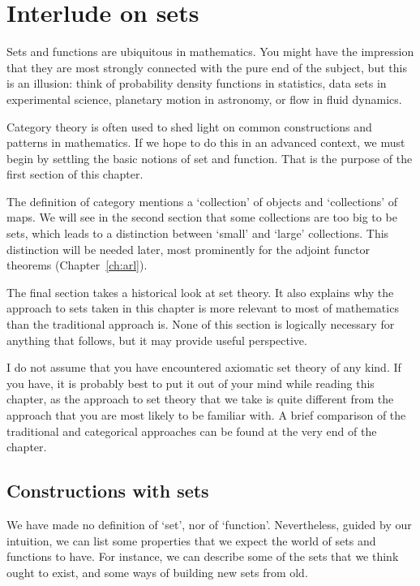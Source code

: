 % 
% 
% 

\chapter{Interlude on sets}
\label{ch:sets}

Sets and functions are ubiquitous in mathematics.  You might have the
impression that they are most strongly connected with the pure end of the
subject, but this is an illusion: think of probability density functions in
statistics, data sets in experimental science, planetary motion in
astronomy, or flow in fluid dynamics.

Category theory is often used to shed light on common constructions and
patterns in mathematics.  If we hope to do this in an advanced context, we
must begin by settling the basic notions of set and function.  That is the
purpose of the first section of this chapter.

The definition of category mentions a `collection' of objects and
`collections' of maps.  We will see in the second section that some
collections are too big to be sets, which leads to a distinction between
`small' and `large' collections.  This distinction will be needed later,
most prominently for the adjoint functor theorems (Chapter~\ref{ch:arl}).

The final section takes a historical look at set theory.  It also explains
why the approach to sets taken in this chapter is more relevant to most of
mathematics than the traditional approach is.  None of this section is
logically necessary for anything that follows, but it may provide useful
perspective.

I do not assume that you have encountered axiomatic set theory of any kind.
If you have, it is probably best to put it out of your mind while reading
this chapter, as the approach to set theory that we take is quite different
from the approach that you are most likely to be familiar with.  A brief
comparison of the traditional and categorical approaches can be found at
the very end of the chapter.



\section{Constructions with sets}
\label{sec:Set-properties}


We have made no definition of `set', nor of `function'.  Nevertheless,
guided by our intuition, we can list some properties that we expect the
world of sets and functions to have.  For instance, we can describe some
of the sets that we think ought to exist, and some ways of building new
sets from old.

